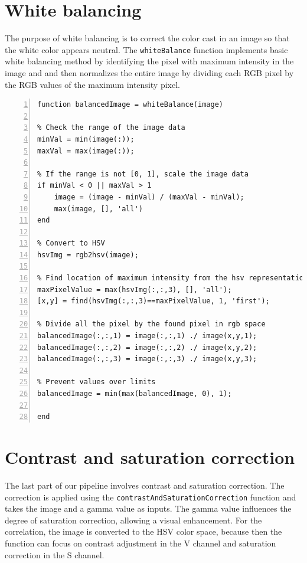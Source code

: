 \documentclass[12pt,a4paper,english
]{tunithesis}
\begin{document}
\section{White balancing}
The purpose of white balancing is to correct the color cast in an image so that the white color appears neutral. The \texttt{whiteBalance} function implements basic white balancing method by identifying the pixel with maximum intensity in the image and and then normalizes the entire image by dividing each RGB pixel by the RGB values of the maximum intensity pixel. 
\begin{lstlisting}[style=Matlab-editor, numbers=left, basicstyle=\footnotesize]
function balancedImage = whiteBalance(image)

% Check the range of the image data
minVal = min(image(:));
maxVal = max(image(:));

% If the range is not [0, 1], scale the image data
if minVal < 0 || maxVal > 1
    image = (image - minVal) / (maxVal - minVal);
    max(image, [], 'all')
end

% Convert to HSV
hsvImg = rgb2hsv(image);

% Find location of maximum intensity from the hsv representation
maxPixelValue = max(hsvImg(:,:,3), [], 'all');
[x,y] = find(hsvImg(:,:,3)==maxPixelValue, 1, 'first');

% Divide all the pixel by the found pixel in rgb space
balancedImage(:,:,1) = image(:,:,1) ./ image(x,y,1);
balancedImage(:,:,2) = image(:,:,2) ./ image(x,y,2);
balancedImage(:,:,3) = image(:,:,3) ./ image(x,y,3);

% Prevent values over limits
balancedImage = min(max(balancedImage, 0), 1);

end
\end{lstlisting}

\section{Contrast and saturation correction}
The last part of our pipeline involves contrast and saturation correction. The correction is applied using the \texttt{contrastAndSaturationCorrection} function and takes the image and a gamma value as inputs. The gamma value influences the degree of saturation correction, allowing a visual enhancement. For the correlation, the image is converted to the HSV color space, because then the function can focus on contrast adjustment in the V channel and saturation correction in the S channel.
\end{document}
